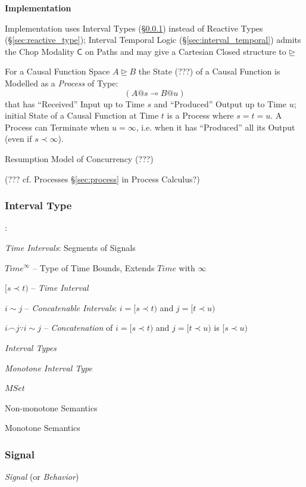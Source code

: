 \textbf{Implementation}

Implementation uses Interval Types (\S\ref{sec:interval_type}) instead
of Reactive Types (\S\ref{sec:reactive_type}); Interval Temporal Logic
(\S\ref{sec:interval_temporal}) admits the Chop Modality $\mathsf{C}$
on Paths and may give a Cartesian Closed structure to $\unrhd$

For a Causal Function Space $A \unrhd B$ the State (???) of a Causal
Function is Modelled as a \emph{Process} of Type:
\[
  (A @ s \multimap B @ u)
\]
that has ``Received'' Input up to Time $s$ and ``Produced'' Output up
to Time $u$; initial State of a Causal Function at Time $t$ is a
Process where $s = t = u$. A Process can Terminate when $u = \infty$,
i.e. when it has ``Produced'' all its Output (even if $s \prec
\infty$).

Resumption Model of Concurrency (???)

(??? cf. Processes \S\ref{sec:process} in Process Calculus?)



\subsubsection{Interval Type}\label{sec:interval_type}

\cite{jeffrey12}:

\emph{Time Intervals}: Segments of Signals

$Time^\infty$ -- Type of Time Bounds, Extends $Time$ with $\infty$

$[s \prec t)$ -- \emph{Time Interval}

$i \sim j$ -- \emph{Concatenable Intervals}: $i = [s \prec t)$ and $j
    = [t \prec u)$

$i \frown j \because i \sim j$ -- \emph{Concatenation} of $i = [s
        \prec t)$ and $j = [t \prec u)$ is $[s \prec u)$



\emph{Interval Types}

\emph{Monotone Interval Type}

$MSet$

Non-monotone Semantics

Monotone Semantics



\subsubsection{Signal}\label{sec:signal_type}

\emph{Signal} (or \emph{Behavior})

